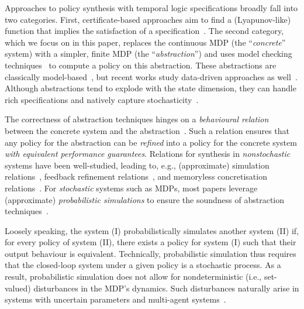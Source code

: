 \documentclass[letterpaper, 10 pt, conference]{ieeeconf}  %
\begin{document}
Approaches to policy synthesis with temporal logic specifications broadly fall into two categories.
First, certificate-based approaches aim to find a (Lyapunov-like) function that implies the satisfaction of a specification~\cite{DBLP:conf/cav/AbateGR25,DBLP:journals/tac/PrajnaJP07}.
The second category, which we focus on in this paper, replaces the continuous MDP (the ``\emph{concrete}'' system) with a simpler, finite MDP (the ``\emph{abstraction}'') and uses model checking techniques~\cite{BaierKatoen08} to compute a policy on this abstraction.
These abstractions are classically model-based~\cite{DBLP:journals/automatica/AbatePLS08,DBLP:journals/tac/ZamaniEMAL14,DBLP:journals/tac/LahijanianAB15,DBLP:journals/jair/BadingsRAPPSJ23,DBLP:conf/hybrid/MathiesenHL25}, but recent works study data-driven approaches as well~\cite{DBLP:conf/l4dc/GraciaBLL24,pmlr-v283-nazeri25a,DBLP:journals/csysl/LavaeiSFZ23}.
Although abstractions tend to explode with the state dimension, they can handle rich specifications and natively capture stochasticity~\cite{DBLP:journals/automatica/LavaeiSAZ22}.

The correctness of abstraction techniques hinges on a \emph{behavioural relation} between the concrete system and the abstraction~\cite{DBLP:books/daglib/0032856}.
Such a relation ensures that any policy for the abstraction can be \emph{refined} into a policy for the concrete system \emph{with equivalent performance guarantees}.
Relations for synthesis in \emph{nonstochastic} systems have been well-studied, leading to, e.g., (approximate) simulation relations~\cite{DBLP:journals/tac/GirardP07}, feedback refinement relations~\cite{DBLP:journals/tac/ReissigWR17}, and memoryless concretisation relations~\cite{DBLP:conf/hybrid/CalbertMGJ24}.
For \emph{stochastic} systems such as MDPs, most papers leverage (approximate) \emph{probabilistic simulations} to ensure the soundness of abstraction techniques~\cite{DBLP:journals/siamco/HaesaertSA17,DBLP:journals/jair/BadingsRAPPSJ23}.

Loosely speaking, the system (I) probabilistically simulates another system (II) if, for every policy of system (II), there exists a policy for system (I) such that their output behaviour is equivalent.
Technically, probabilistic simulation thus requires that the closed-loop system under a given policy is a stochastic process.
As a result, probabilistic simulation does not allow for nondeterministic (i.e., set-valued) disturbances in the MDP's dynamics.
Such disturbances naturally arise in systems with uncertain parameters and multi-agent systems~\cite{BaierKatoen08}.
\end{document}
